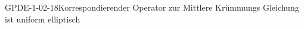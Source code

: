 
\begin{EXA}{GPDE-1-02-18}{Korrespondierender Operator zur Mittlere Krümmungs Gleichung ist uniform elliptisch}
\end{EXA}
